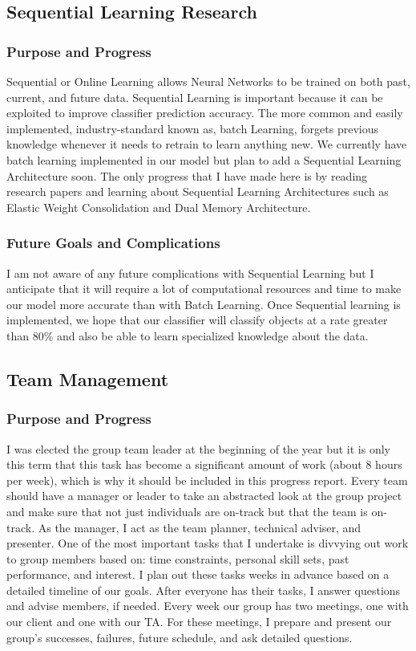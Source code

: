 \documentclass[draftclsnofoot, onecolumn, 10pt, compsoc]{IEEEtran}
\begin{document}
\subsection{Sequential Learning Research}

\subsubsection{Purpose and Progress}
Sequential or Online Learning allows Neural Networks to be trained on both past, current, and future data. Sequential Learning is important because it can be exploited to improve classifier prediction accuracy. \cite{SequentialData} The more common and easily implemented, industry-standard known as, batch Learning, forgets previous knowledge whenever it needs to retrain to learn anything new. We currently have batch learning implemented in our model but plan to add a Sequential Learning Architecture soon. The only progress that I have made here is by reading research papers and learning about Sequential Learning Architectures such as Elastic Weight Consolidation and Dual Memory Architecture.
\subsubsection{Future Goals and Complications}
I am not aware of any future complications with Sequential Learning but I anticipate that it will require a lot of computational resources and time to make our model more accurate than with Batch Learning. Once Sequential learning is implemented, we hope that our classifier will classify objects at a rate greater than 80\% and also be able to learn specialized knowledge about the data.
\subsection{Team Management}
\subsubsection{Purpose and Progress}
I was elected the group team leader at the beginning of the year but it is only this term that this task has become a significant amount of work (about 8 hours per week), which is why it should be included in this progress report. Every team should have a manager or leader to take an abstracted look at the group project and make sure that not just individuals are on-track but that the team is on-track. As the manager, I act as the team planner, technical adviser, and presenter. One of the most important tasks that I undertake is divvying out work to group members based on: time constraints, personal skill sets, past performance, and interest. I plan out these tasks weeks in advance based on a detailed timeline of our goals. After everyone has their tasks, I answer questions and advise members, if needed. Every week our group has two meetings, one with our client and one with our TA. For these meetings, I prepare and present our group's successes, failures, future schedule, and ask detailed questions. 
\end{document}
